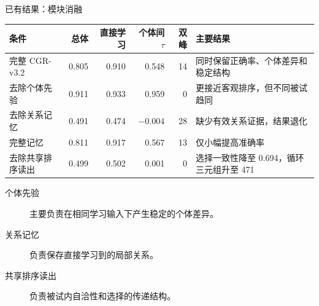 \documentclass[aspectratio=169,11pt]{beamer}
\begin{document}
\begin{frame}{已有结果：模块消融}
  \footnotesize
  \begin{tabularx}{\textwidth}{p{}rrrrX}
    \toprule
    条件 & 总体 & 直接学习 & 个体间 $\tau$ & 双峰 & 主要结果 \\
    \midrule
    完整 CGR-v3.2 & 0.805 & 0.910 & 0.548 & 14 & 同时保留正确率、个体差异和稳定结构 \\
    去除个体先验 & 0.911 & 0.933 & 0.959 & 0 & 更接近客观排序，但不同被试趋同 \\
    去除关系记忆 & 0.491 & 0.474 & $-0.004$ & 28 & 缺少有效关系证据，结果退化 \\
    完整记忆 & 0.811 & 0.917 & 0.567 & 13 & 仅小幅提高准确率 \\
    去除共享排序读出 & 0.499 & 0.502 & 0.001 & 0 & 选择一致性降至 0.694，循环三元组升至 471 \\
    \bottomrule
  \end{tabularx}

  \vspace{0.8em}
  \begin{description}
    \item[个体先验]
      主要负责在相同学习输入下产生稳定的个体差异。
    \item[关系记忆]
      负责保存直接学习到的局部关系。
    \item[共享排序读出]
      负责被试内自洽性和选择的传递结构。
  \end{description}
\end{frame}
\end{document}
